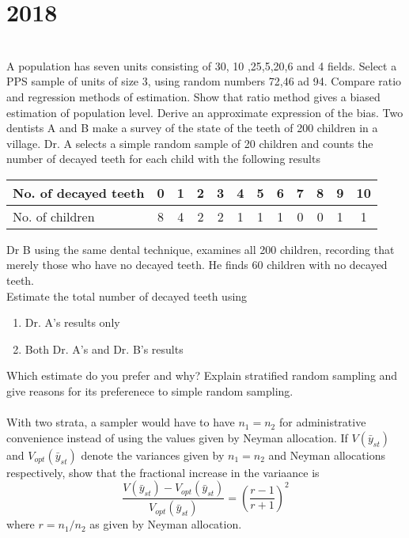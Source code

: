 \section*{2018}
\vspace{-.5cm}
\hrulefill \smallskip\\
 A population has seven units consisting of 30, 10 ,25,5,20,6 and 4 fields. Select a PPS sample of units of size 3, using random numbers 72,46 ad 94.
\myline
{} Compare ratio and regression methods of estimation. Show that ratio method gives a biased estimation of population level. Derive an approximate expression of the bias.
\myline
{} Two dentists A and B make a survey of the state of the teeth of 200 children in a village. Dr. A selects a simple random sample of 20 children and counts the  number of decayed teeth for each child with the following results
\begin{center}
    \begin{tabular}{|l|*{11}{c|}}\hline
        No. of decayed teeth & 0 & 1 & 2 & 3 & 4 & 5 & 6 & 7 & 8 & 9 & 10\\ \hline
        No. of children & 8 & 4 & 2 & 2 & 1 & 1 & 1 & 0 & 0 & 1 & 1\\\hline
    \end{tabular}
\end{center} Dr B using the same dental technique, examines all 200 children, recording that merely those who have no decayed teeth. He finds 60 children with no decayed teeth.\\ Estimate the total number of decayed teeth using
\begin{enumerate}[topsep=0pt, itemsep = -1ex,label=(\roman*)]
    \item Dr. A's results only
    \item Both Dr. A's and Dr. B's results
\end{enumerate} Which estimate do you prefer and why?
\myline
{} Explain stratified random sampling and give reasons for its preferenece to simple random sampling. \\\\ With two strata, a sampler would have to have $n_1 = n_2$ for administrative convenience instead of using the values given by Neyman allocation. If $V(\bar{y}_{st})$ and $V_{opt}(\bar{y}_{st})$ denote the variances given by $n_1 = n_2$ and Neyman allocations respectively, show that the fractional increase in the variaance is
\[ \dfrac{V(\bar{y}_{st}) - V_{opt}(\bar{y}_{st})}{V_{opt}(\bar{y}_{st})} = \left(\dfrac{r-1}{r+1}\right)^2 \] where $r=n_1/n_2$ as given by Neyman allocation.